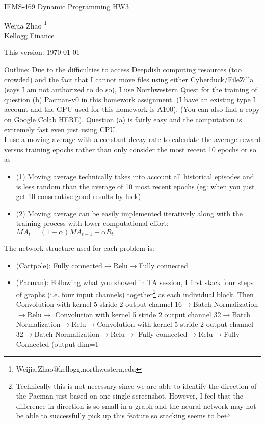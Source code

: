 \documentclass[12pt,letterpaper]{article}
\begin{document}
\begin{center}
\large IEMS-469 Dynamic Programming  HW3

\bigskip
Weijia Zhao \footnote{Weijia.Zhao@kellogg.northwestern.edu}\\
Kellogg Finance

\bigskip
This version: \today
\end{center}

\newpage
Outline: Due to the difficulties to access Deepdish computing resources (too crowded) and the fact that I cannot move files using either Cyberduck/FileZilla (says I am not authorized to do so), I use Northwestern Quest for the training of question (b) Pacman-v0 in this homework assignment. (I have an existing type I account and the GPU used for this homework is A100). (You can also find a copy on Google Colab \href{https://colab.research.google.com/drive/1990i7SjLFgfk_CTRvJBCWppqFl8RlDNg?usp=sharing}{HERE}). Question (a) is fairly easy and the computation is extremely fast even just using CPU.\\

I use a moving average with a constant decay rate to calculate the average reward versus training epochs rather than only consider the most recent 10 epochs or so as
\begin{itemize}
\item (1) Moving average technically takes into account all historical episodes and is less random than the average of 10 most recent epochs (eg: when you just get 10 consecutive good results by luck)
\item (2) Moving average can be easily implemented iteratively along with the training process with lower computational effort: $MA_t=(1-\alpha)MA_{t-1}+\alpha R_t$
\end{itemize}

The network structure used for each problem is:
\begin{itemize}
\item (Cartpole): Fully connected$\rightarrow$Relu$\rightarrow$Fully connected
\item (Pacman): Following what you showed in TA session, I first stack four steps of graphs (i.e. four input channels) together\footnote{Technically this is not necessary since we are able to identify the direction of the Pacman just based on one single screenshot. However, I feel that the difference in direction is so small in a graph and the neural network may not be able to successfully pick up this feature so stacking seems to be } as each individual block. Then Convolution with kernel 5 stride 2 output channel 16$\rightarrow$Batch Normalization$\rightarrow$Relu$\rightarrow$ Convolution with kernel 5 stride 2 output channel 32$\rightarrow$Batch Normalization$\rightarrow$Relu$\rightarrow$Convolution with kernel 5 stride 2 output channel 32$\rightarrow$Batch Normalization$\rightarrow$Relu$\rightarrow$ Fully connected$\rightarrow$Relu$\rightarrow$Fully Connected (output dim=1
\end{itemize}
\end{document}

